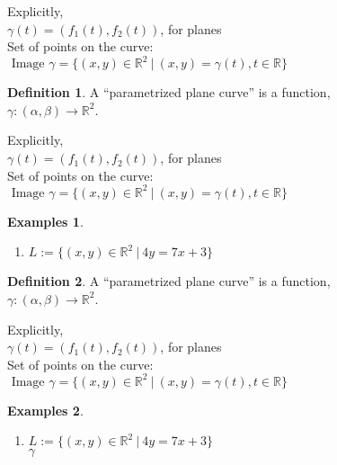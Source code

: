 \documentclass[twocolumn,20pt,fleqn]{extarticle}
\theoremstyle{plain}
\theoremstyle{definition}
\newtheorem*{definition}{Definition}
\newtheorem*{exmpls}{Examples}
\theoremstyle{remark}
\newenvironment*{examples}{\begin{exmpls} ~ \begin{enumerate}}{\end{enumerate}\end{exmpls}}
\begin{document}
Explicitly,\\
$\gamma(t) = (f_1(t), f_2(t))$, for planes\\

Set of points on the curve:\\  $\textrm{ Image } \gamma = \{(x,y) \in \mathbb{R}^2 \ |\ (x,y) = \gamma(t), t \in \mathbb{R}\}$







\clearpage




\begin{definition}
  A  ``parametrized plane curve''  is a  function,\\ $\gamma  : (\alpha, \beta) \to \mathbb{R}^2$.
\end{definition}

Explicitly,\\
$\gamma(t) = (f_1(t), f_2(t))$, for planes\\

Set of points on the curve:\\  $\textrm{ Image } \gamma = \{(x,y) \in \mathbb{R}^2 \ |\ (x,y) = \gamma(t), t \in \mathbb{R}\}$




\begin{examples}
  \item $L:=\{(x,y) \in \mathbb{R}^2\ |\ 4y = 7x + 3\}$\\
  \end{examples}


\clearpage




\begin{definition}
  A  ``parametrized plane curve''  is a  function,\\ $\gamma  : (\alpha, \beta) \to \mathbb{R}^2$.
\end{definition}

Explicitly,\\
$\gamma(t) = (f_1(t), f_2(t))$, for planes\\

Set of points on the curve:\\  $\textrm{ Image } \gamma = \{(x,y) \in \mathbb{R}^2 \ |\ (x,y) = \gamma(t), t \in \mathbb{R}\}$




\begin{examples}
  \item $L:=\{(x,y) \in \mathbb{R}^2\ |\ 4y = 7x + 3\}$\\
  $\gamma $\end{examples}
\end{document}
